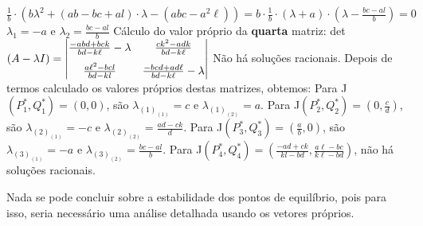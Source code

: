 $\frac{1}{b} \cdot (b\lambda^2 +(ab-bc+al) \cdot \lambda - (abc-a^2\ell))=b \cdot \frac{1}{b} \cdot (\lambda +a ) \cdot \left(\lambda- \frac{bc-al}{b}\right)=0$\medskip\newline
$\lambda_1=-a$ e $\lambda_2=\frac{bc-al}{b}$
\bigskip\medskip\newline\noindent Cálculo do valor próprio da \textbf{quarta} matriz: \bigskip\medskip\newline\noindent
det$(A- \lambda I)=\renewcommand{\arraystretch}{1.25}
\begin{vmatrix}
  \frac{-abd+bck}{bd-k\ell}-\lambda & \frac{ck^2-adk}{bd-k\ell}\medskip  \\
  \frac{a\ell^2-bcl}{bd-kl} & \frac{-bcd+ad\ell}{bd-k\ell} -\lambda
\end{vmatrix}$\medskip\newline
Não há soluções racionais.\bigskip\newline
Depois de termos calculado os valores próprios destas matrizes, obtemos:\medskip\newline
Para J$(P_{1}^{*},Q_{1}^{*})=\left(0,0\right)$, são $\lambda_(1)_(1)=c$ e $\lambda_(1)_(2)=a$.\medskip\newline
Para J$(P_{2}^{*},Q_{2}^{*})=\left(0,\frac{c}{d}\right)$, são $\lambda_(2)_(1)=-c$ e $\lambda_(2)_(2)=\frac{ad-ck}{d}$.\medskip\newline
Para J$(P_{3}^{*},Q_{3}^{*})=\left(\frac{a}{b},0\right)$, são $\lambda_(3)_(1)=-a$ e $\lambda_(3)_(2)=\frac{bc-al}{b}$.\medskip\newline
Para J$(P_{4}^{*},Q_{4}^{*})=\left(\frac {-ad+ck}{kl-bd},\frac{a \ell-bc}{k \ell-bd}\right)$, não há soluções racionais.\medskip\newline


\noindent Nada se pode concluir sobre a estabilidade dos pontos de equilíbrio, pois para isso, seria necessário uma análise detalhada usando os vetores próprios.
